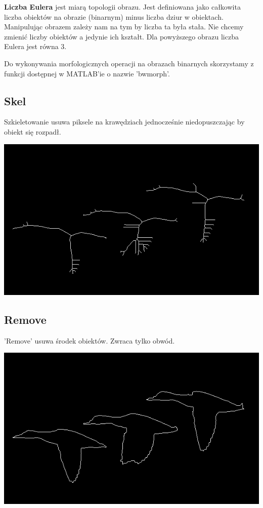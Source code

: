 \documentclass{article}
\begin{document}
	\textbf{Liczba Eulera} jest miarą topologii obrazu. Jest definiowana jako całkowita liczba obiektów na obrazie (binarnym) minus liczba dziur w obiektach.
	Manipulując obrazem zależy nam na tym by liczba ta była stała. Nie chcemy zmienić liczby obiektów a jedynie ich kształt. Dla powyższego obrazu liczba Eulera jest równa 3.

	Do wykonywania morfologicznych operacji na obrazach binarnych skorzystamy z funkcji dostępnej w MATLAB'ie o nazwie 'bwmorph'.	
	\subsection{Skel}
	Szkieletowanie usuwa piksele na krawędziach jednocześnie niedopuszczając by obiekt się rozpadł.
	\begin{center}
		\includegraphics[width=\linewidth]{../../lab05/kaczki_skeleton.png}
	\end{center}
	
	\subsection{Remove}
	'Remove' usuwa środek obiektów. Zwraca tylko obwód.
	\begin{center}
		\includegraphics[width=\linewidth]{../../lab05/kaczki_perimeter.png}
	\end{center}
\end{document}
